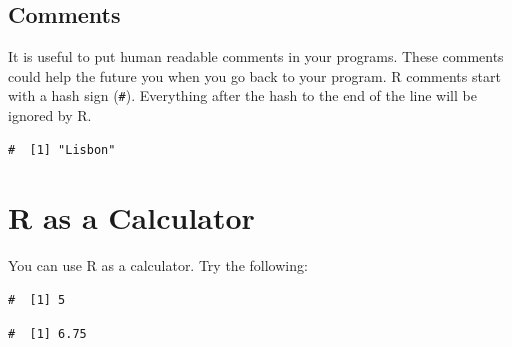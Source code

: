 \documentclass[a4paper,9pt,twocolumn,twoside,printwatermark=false]{pinp}
\begin{document}
\subsection{Comments}\label{comments}

It is useful to put human readable comments in your programs. These
comments could help the future you when you go back to your program. R
comments start with a hash sign (\texttt{\#}). Everything after the hash
to the end of the line will be ignored by R.

\begin{Shaded}
\begin{Highlighting}[]
\end{Highlighting}
\end{Shaded}

\begin{ShadedResult}
\begin{verbatim}
#  [1] "Lisbon"
\end{verbatim}
\end{ShadedResult}

\section{R as a Calculator}\label{r-as-a-calculator}

You can use R as a calculator. Try the following:

\begin{Shaded}
\begin{Highlighting}[]
 \OperatorTok{+}\StringTok{ }           
\end{Highlighting}
\end{Shaded}

\begin{ShadedResult}
\begin{verbatim}
#  [1] 5
\end{verbatim}
\end{ShadedResult}

\begin{Shaded}
\begin{Highlighting}[]
\NormalTok{(}\OperatorTok{*}\NormalTok{)}\OperatorTok{/} \OperatorTok{-}\StringTok{ }     
\end{Highlighting}
\end{Shaded}

\begin{ShadedResult}
\begin{verbatim}
#  [1] 6.75
\end{verbatim}
\end{ShadedResult}
\end{document}
